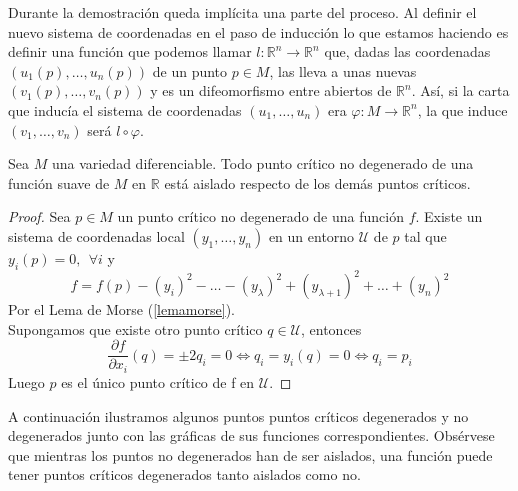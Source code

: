 \begin{remark}
    Durante la demostración queda implícita una parte del proceso. Al definir el nuevo sistema de coordenadas en el paso de inducción lo que estamos haciendo es definir una función que podemos llamar $l:\mathbb{R}^n \to \mathbb{R}^n$ que, dadas las coordenadas $(u_1(p),\dots, u_n(p))$ de un punto $p\in M$, las lleva a unas nuevas $(v_1(p),\dots, v_n(p))$ y es un difeomorfismo entre abiertos de $\mathbb{R}^n$. Así, si la carta que inducía el sistema de coordenadas $(u_1,\dots, u_n)$ era $\varphi : M \to \mathbb{R}^n$, la que induce $(v_1,\dots, v_n)$ será $l\circ \varphi$.
\end{remark}
\bigskip

\begin{corollary}
        Sea $M$ una variedad diferenciable. Todo punto crítico no degenerado de una función suave de $M$ en $\mathbb{R}$ está aislado respecto de los demás puntos críticos.
\end{corollary}
\begin{proof}
    Sea $p\in M$ un punto crítico no degenerado de una función $f$. Existe un sistema de coordenadas local $(y_1,\dots, y_n)$ en un entorno $\mathcal{U}$ de $p$ tal que $y_i(p)=0,~~\forall i$ y 
    \begin{equation*}
        f=f(p)-(y_i)^2-\dots-(y_\lambda)^2 + (y_{\lambda +1})^2+\dots + (y_n)^2
    \end{equation*}
    Por el Lema de Morse (\ref{lemamorse}).\\

    Supongamos que existe otro punto crítico $q\in\mathcal{U}$, entonces
    \begin{equation*}
        \frac{\partial f}{\partial x_i}(q)=\pm 2q_i= 0\iff q_i= y_i(q)=0\iff q_i=p_i
    \end{equation*}
    Luego $p$ es el único punto crítico de f en $\mathcal{U}$.
    
\end{proof}

A continuación ilustramos algunos puntos puntos críticos degenerados y no degenerados junto con las gráficas de sus funciones correspondientes. Obsérvese que mientras los puntos no degenerados han de ser aislados, una función puede tener puntos críticos degenerados tanto aislados como no.


